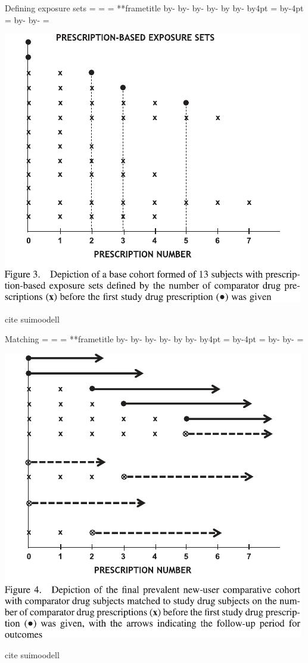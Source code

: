 \documentclass[aspectratio=169,12pt]{beamer} %
\makeatletter
\newif\ifsidebartheme
\newcommand*{\calculatespace}{%
    \contentheight=\paperheight%
    \ifx\beamer@frametitle\@empty%
        \setbox\@tempboxa=\box\voidb@x%
      \else%
        \setbox\@tempboxa=\vbox{%
          \vbox{}%
          {\parskip0pt\usebeamertemplate***{frametitle}}%
        }%
        \ifsidebartheme%
          \advance\contentheight by-1em%
        \fi%
      \fi%
    \advance\contentheight by-\ht\@tempboxa%
    \advance\contentheight by-\dp\@tempboxa%
    \advance\contentheight by-\beamer@frametopskip%
    \ifbeamer@plainframe%
    \contentbottom=0pt%
    \else%
    \advance\contentheight by-\headheight%
    \advance\contentheight by\headdp%
    \advance\contentheight by-\footheight%
    \advance\contentheight by4pt%
    \contentbottom=\footheight%
    \advance\contentbottom by-4pt%
    \fi%
    \contentwidth=\paperwidth%
    \ifbeamer@plainframe%
    \contentleft=0pt%
    \else%
    \advance\contentwidth by-\beamer@rightsidebar%
    \advance\contentwidth by-\beamer@leftsidebar\relax%
    \contentleft=\beamer@leftsidebar%
    \fi%
}
\makeatother
\begin{document}
\begin{frame}{Defining exposure sets}
    \calculatespace%
    \begin{center}
	\includegraphics[height=0.85\contentheight]{ref/suimoodell-fig3.pdf}
    \end{center}
    cite suimoodell
\end{frame}

\begin{frame}{Matching}
    \calculatespace%
    \begin{center}
	\includegraphics[height=0.85\contentheight]{ref/suimoodell-fig4.pdf}
    \end{center}
    cite suimoodell
\end{frame}
\end{document}
